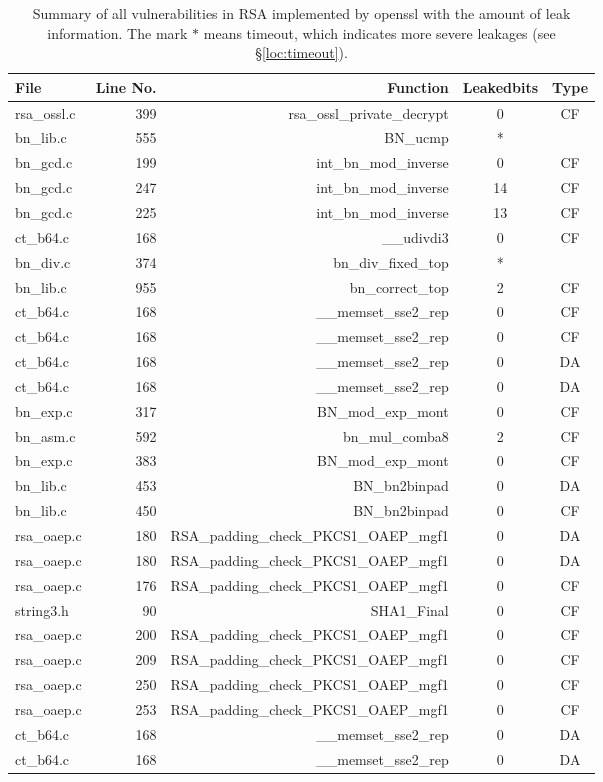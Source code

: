 \begin{table*}%
\centering
\caption{Summary of all vulnerabilities in RSA implemented by openssl with the amount of leak information.
The mark $*$ means timeout,
      which indicates more severe leakages (see \S\ref{loc:timeout}).}\label{tab:RSAopenssl}
\begin{tabular}{lrrcc}
\hline
\textbf{File} & \textbf{Line No.} & \textbf{Function} & \textbf{Leakedbits} & \textbf{Type} \\\hline
rsa\_ossl.c&399&rsa\_ossl\_private\_decrypt&0 &CF\\
bn\_lib.c&555&BN\_ucmp&*&\\
bn\_gcd.c&199&int\_bn\_mod\_inverse&0 &CF\\
bn\_gcd.c&247&int\_bn\_mod\_inverse&14&CF\\
bn\_gcd.c&225&int\_bn\_mod\_inverse&13&CF\\
ct\_b64.c&168&\_\_udivdi3&0 &CF\\
bn\_div.c&374&bn\_div\_fixed\_top&*&\\
bn\_lib.c&955&bn\_correct\_top&2 &CF\\
ct\_b64.c&168&\_\_memset\_sse2\_rep&0 &CF\\
ct\_b64.c&168&\_\_memset\_sse2\_rep&0 &CF\\
ct\_b64.c&168&\_\_memset\_sse2\_rep&0 &DA\\
ct\_b64.c&168&\_\_memset\_sse2\_rep&0 &DA\\
bn\_exp.c&317&BN\_mod\_exp\_mont&0 &CF\\
bn\_asm.c&592&bn\_mul\_comba8&2 &CF\\
bn\_exp.c&383&BN\_mod\_exp\_mont&0 &CF\\
bn\_lib.c&453&BN\_bn2binpad&0 &DA\\
bn\_lib.c&450&BN\_bn2binpad&0 &CF\\
rsa\_oaep.c&180&RSA\_padding\_check\_PKCS1\_OAEP\_mgf1&0 &DA\\
rsa\_oaep.c&180&RSA\_padding\_check\_PKCS1\_OAEP\_mgf1&0 &DA\\
rsa\_oaep.c&176&RSA\_padding\_check\_PKCS1\_OAEP\_mgf1&0 &CF\\
string3.h& 90&SHA1\_Final&0 &CF\\
rsa\_oaep.c&200&RSA\_padding\_check\_PKCS1\_OAEP\_mgf1&0 &CF\\
rsa\_oaep.c&209&RSA\_padding\_check\_PKCS1\_OAEP\_mgf1&0 &CF\\
rsa\_oaep.c&250&RSA\_padding\_check\_PKCS1\_OAEP\_mgf1&0 &CF\\
rsa\_oaep.c&253&RSA\_padding\_check\_PKCS1\_OAEP\_mgf1&0 &CF\\
ct\_b64.c&168&\_\_memset\_sse2\_rep&0 &DA\\
ct\_b64.c&168&\_\_memset\_sse2\_rep&0 &DA\\
\hline
\end{tabular}
\end{table*}

